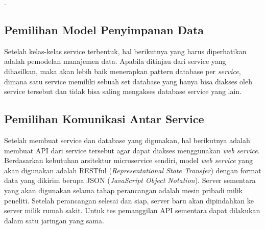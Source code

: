\begin{adjustbox}{width=1\textwidth}
	\begin{minipage}{\linewidth}
		.
	\end{minipage}
\end{adjustbox}

\subsection{Pemilihan Model Penyimpanan Data}
Setelah kelas-kelas service terbentuk, hal berikutnya yang harus diperhatikan adalah pemodelan manajemen data. Apabila ditinjau dari service yang dihasilkan, maka akan lebih baik menerapkan pattern database per \textit{service}, dimana satu service memiliki sebuah set database yang hanya bisa diakses oleh service tersebut dan tidak bisa saling mengakses database service yang lain.
\subsection{Pemilihan Komunikasi Antar Service}
Setelah membuat service dan database yang digunakan, hal berikutnya adalah membuat API dari service tersebut agar dapat diakses menggunakan \textit{web service}. Berdasarkan kebutuhan arsitektur microservice sendiri, model \textit{web service} yang akan digunakan adalah RESTful (\textit{Representational State Transfer}) dengan format data yang dikirim berupa JSON (\textit{JavaScript Object Notation}). Server sementara yang akan digunakan selama tahap perancangan adalah mesin pribadi milik peneliti. Setelah perancangan selesai dan siap, server baru akan dipindahkan ke server milik rumah sakit. Untuk tes pemanggilan API sementara dapat dilakukan dalam satu jaringan yang sama.

